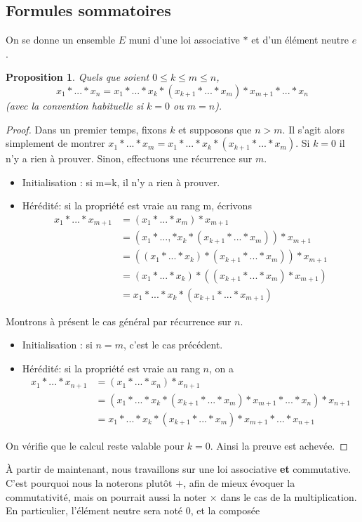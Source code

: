 \documentclass[french]{book}
\theoremstyle{plain}
\newtheorem{prop}{Proposition}[chapter]
\theoremstyle{definition}
\theoremstyle{remark}
\begin{document}
\subsection{Formules sommatoires}
On se donne un ensemble $E$ muni d'une loi associative $*$ et d'un élément neutre $e$.
\begin{prop}
	Quels que soient $0\leqslant k\leqslant m\leqslant n$, $$x_{1}*...*x_{n}=x_{1}*...*x_{k}*(x_{k+1}*...*x_{m})*x_{m+1}*...*x_{n}$$
(avec la convention habituelle si $k=0$ ou $m=n$).
\end{prop}
\begin{proof}
	Dans un premier temps, fixons $k$ et supposons que $n>m$. Il s'agit alors simplement de montrer $x_{1}*...*x_{m}=x_{1}*...*x_{k}*(x_{k+1}*...*x_{m}).$ Si $k=0$ il n'y a rien à prouver. Sinon, effectuons une récurrence sur $m$.
\begin{itemize}
	\item Initialisation : si m=k, il n'y a rien à prouver.
	\item Hérédité: si la propriété est vraie au rang m, écrivons 
	\begin{align*}
		x_{1}*...*x_{m+1}&=(x_{1}*...*x_{m})*x_{m+1}\\
		&=(x_{1}*...,*x_{k}*(x_{k+1}*...*x_{m}))*x_{m+1}\\
		&=((x_{1}*...*x_{k})*(x_{k+1}*...*x_{m}))*x_{m+1}\\
		&=(x_{1}*...*x_{k})*((x_{k+1}*...*x_{m})*x_{m+1})\\
		&=x_{1}*...*x_{k}*(x_{k+1}*...*x_{m+1})
	\end{align*}
\end{itemize}
Montrons à présent le cas général par récurrence sur $n$.
\begin{itemize}
	\item Initialisation : si $n=m$, c'est le cas précédent.
	\item Hérédité: si la propriété est vraie au rang $n$, on a
	\begin{align*}
		x_{1}*...*x_{n+1}&=(x_{1}*...*x_{n})*x_{n+1}\\	
		&=(x_{1}*...*x_{k}*(x_{k+1}*...*x_{m})*x_{m+1}*...*x_{n})*x_{n+1}\\
		&=x_{1}*...*x_{k}*(x_{k+1}*...*x_{m})*x_{m+1}*...*x_{n+1}
	\end{align*}
\end{itemize}
On vérifie que le calcul reste valable pour $k=0$. Ainsi la preuve est achevée.
\end{proof}
À partir de maintenant, nous travaillons sur une loi associative \textbf{et} commutative. C'est pourquoi nous la noterons plutôt $+$, afin de mieux évoquer la commutativité, mais on pourrait aussi la noter $\times$ dans le cas de la multiplication. En particulier, l'élément neutre sera noté $0$, et la composée
\end{document}
